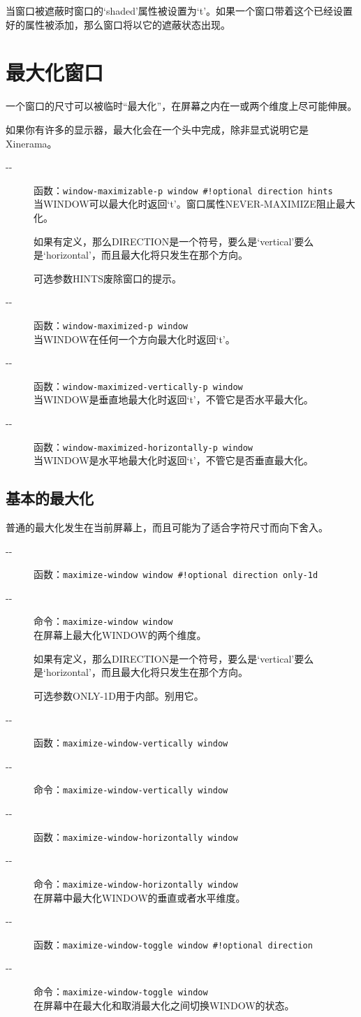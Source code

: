 \documentclass{book}
\begin{document}
\begin{CJK*}{UTF8}{gbsn}
当窗口被遮蔽时窗口的`shaded'属性被设置为`t'。如果一个窗口带着这个已经设置好的属性被添加，那么窗口将以它的遮蔽状态出现。
\section{最大化窗口}
一个窗口的尺寸可以被临时``最大化''，在屏幕之内在一或两个维度上尽可能伸展。

如果你有许多的显示器，最大化会在一个头中完成，除非显式说明它是Xinerama。
\begin{description}
\item[-{}-] 函数：\verb|window-maximizable-p window #!optional direction hints|\\
当WINDOW可以最大化时返回`t'。窗口属性NEVER-MAXIMIZE阻止最大化。

如果有定义，那么DIRECTION是一个符号，要么是`vertical'要么是`horizontal'，而且最大化将只发生在那个方向。

可选参数HINTS废除窗口的提示。
\item[-{}-] 函数：\verb|window-maximized-p window|\\
当WINDOW在任何一个方向最大化时返回`t'。
\item[-{}-] 函数：\verb|window-maximized-vertically-p window|\\
当WINDOW是垂直地最大化时返回`t'，不管它是否水平最大化。
\item[-{}-] 函数：\verb|window-maximized-horizontally-p window|\\
当WINDOW是水平地最大化时返回`t'，不管它是否垂直最大化。
\end{description}
\subsection{基本的最大化}
普通的最大化发生在当前屏幕上，而且可能为了适合字符尺寸而向下舍入。
\begin{description}
\item[-{}-] 函数：\verb|maximize-window window #!optional direction only-1d|
\item[-{}-] 命令：\verb|maximize-window window|\\
在屏幕上最大化WINDOW的两个维度。

如果有定义，那么DIRECTION是一个符号，要么是`vertical'要么是`horizontal'，而且最大化将只发生在那个方向。

可选参数ONLY-1D用于内部。别用它。
\item[-{}-] 函数：\verb|maximize-window-vertically window|
\item[-{}-] 命令：\verb|maximize-window-vertically window|
\item[-{}-] 函数：\verb|maximize-window-horizontally window|
\item[-{}-] 命令：\verb|maximize-window-horizontally window|\\
在屏幕中最大化WINDOW的垂直或者水平维度。
\item[-{}-] 函数：\verb|maximize-window-toggle window #!optional direction|
\item[-{}-] 命令：\verb|maximize-window-toggle window|\\
在屏幕中在最大化和取消最大化之间切换WINDOW的状态。


\end{description}
\end{CJK*}
\end{document}
